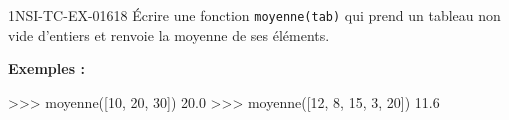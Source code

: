 \begin{exercice}{1NSI-TC-EX-016}{1}{8}
Écrire une fonction \lstinline{moyenne(tab)} qui prend un tableau non vide d'entiers
et renvoie la moyenne de ses éléments.

\textbf{Exemples :}
\begin{console}
>>> moyenne([10, 20, 30])
20.0
>>> moyenne([12, 8, 15, 3, 20])
11.6
\end{console}
\end{exercice}
